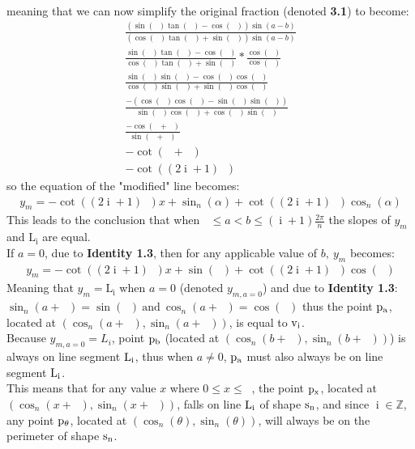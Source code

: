 \documentclass[11pt]{article}
\DeclareMathOperator{\custi}{\mathrm{i}}
\DeclareMathOperator{\period}{\frac{2\pi}{n}}
\DeclareMathOperator{\hp}{\frac{\pi}{n}}
\DeclareMathOperator{\iperiod}{\custi\frac{2\pi}{n}}
\begin{document}
\pagebreak\\
meaning that we can now simplify the original fraction (denoted \textbf{3.1}) to become:
\begin{gather*}
\frac{(\sin(\iperiod)\tan(\hp)-\cos(\iperiod))\sin(a-b)}{(\cos(\iperiod)\tan(\hp)+\sin(\iperiod))\sin(a-b)}\\
\frac{\sin(\iperiod)\tan(\hp)-\cos(\iperiod)}{\cos(\iperiod)\tan(\hp)+\sin(\iperiod)} * \frac{\cos(\hp)}{\cos(\hp)}\\
\frac{\sin(\iperiod)\sin(\hp)-\cos(\iperiod)\cos(\hp)}{\cos(\iperiod)\sin(\hp)+\sin(\iperiod)\cos(\hp)}\\
\frac{-(\cos(\iperiod)\cos(\hp)-\sin(\iperiod)\sin(\hp))}{\sin(\hp)\cos(\iperiod)+\cos(\hp)\sin(\iperiod)}\\
\frac{-\cos(\iperiod+\hp)}{\sin(\iperiod+\hp)}\\
-\cot(\iperiod+\hp)\\
-\cot((2\custi+1)\hp)
\end{gather*}
so the equation of the "modified" line becomes:
\begin{gather*}
y_m=-\cot((2\custi+1)\hp)x+\sin_n(\alpha)+\cot((2\custi+1)\hp)\cos_n(\alpha)
\end{gather*}
This leads to the conclusion that when \(\iperiod\leq a<b\leq(\custi+1)\frac{2\pi}{n}\) the slopes of \(y_m\) and \(\mathrm{L_i}\) are equal. \\
If \(a=0\), due to \textbf{Identity 1.3}, then for any applicable value of \(b,\ y_m\) becomes:
\begin{gather*}
y_m=-\cot((2\custi+1)\hp)x+\sin(\iperiod)+\cot((2\custi+1)\hp)\cos(\iperiod)
\end{gather*}
Meaning that \(y_m=\mathrm{L_i}\) when \(a=0\) (denoted  \(y_{m,a=0}\)) and due to \textbf{Identity 1.3}: \(\sin_n(a+\iperiod)=\sin(\iperiod) \mathrm{\ and\ } \cos_n(a+\iperiod)=\cos(\iperiod)\) thus the point \(\rm p_a\), located at \((\cos_n(a+\iperiod), \sin_n(a+\iperiod))\), is equal to \(\rm v_i\).\\
Because \(y_{m,a=0} = L_i\), point \(\rm p_b\) (located at \((\cos_n(b+\iperiod),\sin_n(b+\iperiod))\)) is always on line segment \(\rm L_i\), thus when \(a\neq0\), \(\rm p_a\) must also always be on line segment \(\rm L_i\).\\
This means that for any value \(x\) where \(0\leq x \leq\period\), the point \(\rm p_x\), located at \((\cos_n(x+\iperiod),\sin_n(x+\iperiod))\), falls on line \(\rm L_i\) of shape \(\rm s_n\), and since \(\custi\in\mathbb{Z}\), any point \(\rm p_\theta\), located at \((\cos_n(\theta),\sin_n(\theta))\), will always be on the perimeter of shape \(\rm s_n\).
\end{document}
